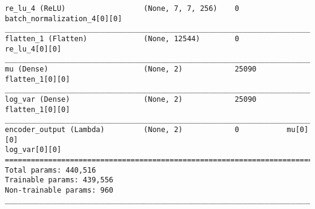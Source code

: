 \begin{lstlisting}[caption={\textsc{Mnist}-\ac{VAE} Encoder},captionpos=b,basicstyle=\tiny, label={lst:mnist-vae-encoder}]
re_lu_4 (ReLU)                  (None, 7, 7, 256)    0           batch_normalization_4[0][0]
__________________________________________________________________________________________________
flatten_1 (Flatten)             (None, 12544)        0           re_lu_4[0][0]
__________________________________________________________________________________________________
mu (Dense)                      (None, 2)            25090       flatten_1[0][0]
__________________________________________________________________________________________________
log_var (Dense)                 (None, 2)            25090       flatten_1[0][0]
__________________________________________________________________________________________________
encoder_output (Lambda)         (None, 2)            0           mu[0][0]
log_var[0][0]
==================================================================================================
Total params: 440,516
Trainable params: 439,556
Non-trainable params: 960
__________________________________________________________________________________________________
\end{lstlisting}